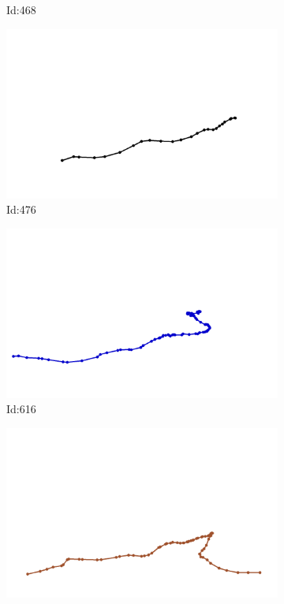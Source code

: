 \documentclass[12pt,twoside]{report}
\begin{document}
\begin{figure}
\begin{subfigure}[b]{0.20\textwidth}
\caption{Id:468}
\end{subfigure}
\begin{subfigure}[b]{0.20\textwidth}
\centering
\includegraphics[width=\textwidth]{../../trajectories/476.png}
\caption{Id:476}
\end{subfigure}
\begin{subfigure}[b]{0.20\textwidth}
\centering
\includegraphics[width=\textwidth]{../../trajectories/616.png}
\caption{Id:616}
\end{subfigure}
\begin{subfigure}[b]{0.20\textwidth}
\centering
\includegraphics[width=\textwidth]{../../trajectories/628.png}

\end{subfigure}
\end{figure}
\end{document}
